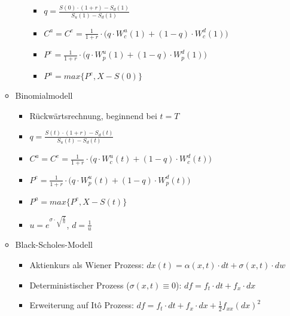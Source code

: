 \begin{itemize}
\begin{itemize}
\begin{enumerate}
			\begin{itemize}
				\item \(q=\frac{S(0)\cdot(1+r)-S_d(1)}{S_u(1)-S_d(1)}\)
				\item \(C^a=C^e=\frac{1}{1+r}\cdot\Big(q\cdot W_c^u(1)+(1-q)\cdot W_c^d(1)\Big)\)
				\item \(P^e=\frac{1}{1+r}\cdot\Big(q\cdot W_p^u(1)+(1-q)\cdot W_p^d(1)\Big)\)
				\item \(P^a=max\Big\{P^e,X-S(0)\Big\}\)
			\end{itemize}
		\end{enumerate}
		\item Binomialmodell
		\begin{itemize}
			\item Rückwärtsrechnung, beginnend bei \(t=T\)
			\item \(q=\frac{S(t)\cdot(1+r)-S_d(t)}{S_u(t)-S_d(t)}\)
			\item \(C^a=C^e=\frac{1}{1+r}\cdot\Big(q\cdot W_c^u(t)+(1-q)\cdot W_c^d(t)\Big)\)
			\item \(P^e=\frac{1}{1+r}\cdot\Big(q\cdot W_p^u(t)+(1-q)\cdot W_p^d(t)\Big)\)
			\item \(P^a=max\Big\{P^e,X-S(t)\Big\}\)
			\item \(u=e^{\sigma\cdot\sqrt{\frac{T}{n}}}\), \(d=\frac{1}{u}\)
		\end{itemize}
		\item Black-Scholes-Modell
		\begin{itemize}
			\item Aktienkurs als Wiener Prozess: \(dx(t) = \alpha(x,t)\cdot dt + \sigma(x,t)\cdot dw\)
			\item Deterministischer Prozess (\(\sigma(x,t) \equiv 0\)): \(df=f_t\cdot dt + f_x\cdot dx\)
			\item Erweiterung auf Itô Prozess: \(df=f_t\cdot dt + f_x\cdot dx + \frac{1}{2} f_{xx}(dx)^2\)
		\end{itemize}
	\end{itemize}
\end{itemize}
